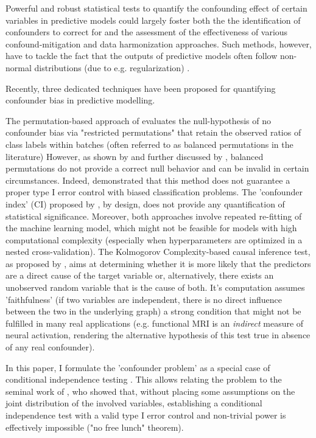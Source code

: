 \documentclass{article}
\begin{document}
Powerful and robust statistical tests to quantify the confounding effect of certain variables in predictive models could largely foster both the the identification of confounders to correct for and the assessment of the effectiveness of various confound-mitigation and data harmonization approaches. Such methods, however, have to tackle the fact that the outputs of predictive models often follow non-normal distributions (due to e.g. regularization) \citep{garcia2009study, kristensen2017whole}.

Recently, three dedicated techniques \citep{chaibub2019permutation, ferrari2020measuring, wachinger2021detect} have been proposed for quantifying confounder bias in predictive modelling.

The permutation-based approach of \cite{chaibub2019permutation} evaluates the null-hypothesis of no confounder bias via "restricted permutations" that retain the observed ratios of class labels within batches (often referred to as balanced permutations in the literature) However, as shown by \cite{southworth2009properties} and further discussed by \cite{hemerik2018exact}, balanced permutations do not provide a correct null behavior and can be invalid in certain circumstances. Indeed, \cite{ferrari2020measuring} demonstrated that this method does not guarantee a proper type I error control with biased classification problems.
The 'confounder index' (CI) proposed by \cite{ferrari2020measuring}, by design, does not provide any quantification of statistical significance.
Moreover, both approaches involve repeated re-fitting of the machine learning model, which might not be feasible for models with high computational complexity (especially when hyperparameters are optimized in a nested cross-validation).
The Kolmogorov Complexity-based causal inference test, as proposed by \cite{wachinger2021detect}, aims at determining whether it is more likely that the predictors are a direct cause of the target variable or, alternatively, there exists an unobserved random variable that is the cause of both. It's computation assumes 'faithfulness' (if two variables are independent, there is no direct influence between the two in the underlying graph) a strong condition that might not be fulfilled in many real applications (e.g. functional MRI is an \emph{indirect} measure of neural activation, rendering the alternative hypothesis of this test true in absence of any real confounder).


In this paper, I formulate the 'confounder problem' as a special case of conditional independence testing \citep{dawid1979conditional}. This allows relating the problem to the seminal work of \cite{shah2020hardness}, who showed that, without placing some assumptions on the joint distribution of the involved variables, establishing a conditional independence test with a valid type I error control and non-trivial power is effectively impossible ("no free lunch" theorem).
\end{document}
